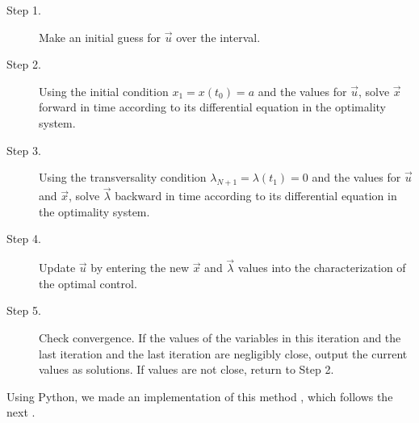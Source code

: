     \begin{description}
    	\item[Step 1.]
        	Make an initial guess for $\vec{u}$ over the interval.
        \item[Step 2.]
        	Using the initial condition $x_1 = x(t_0) = a$ and the values for 
            $\vec{u}$, solve $\vec{x}$ forward in time according to its differential
            equation in the optimality system.
    	\item[Step 3.]
        	Using the transversality condition $\lambda_{N+1} = \lambda(t_1) = 0$ 
            and the values for $\vec{u}$ and $\vec{x}$, solve $\vec{\lambda}$ 
            backward in time according to its differential equation in the optimality
            system.
        \item[Step 4.]
        	Update $\vec{u}$ by entering the new $\vec{x}$ and $\vec{\lambda}$ values 
            into the characterization of the optimal control. 
    	\item[Step 5.]
        	Check convergence. If the values of the variables in this iteration and 
            the last iteration and the last iteration are negligibly close, output the 
            current values as solutions. If values are not close, return to Step 2.
    \end{description}

    Using Python, we made an implementation of this method \citep{python_Thesisrepo},
    which follows the next  . 

